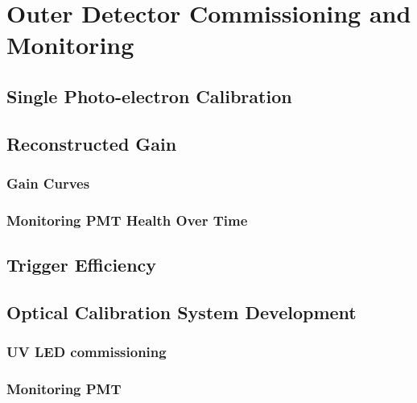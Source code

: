 \chapter{Outer Detector Commissioning and Monitoring}
\section{Single Photo-electron Calibration}

\section{Reconstructed Gain}
\subsection{Gain Curves}
\subsection{Monitoring PMT Health Over Time}

\section{Trigger Efficiency}

\section{Optical Calibration System Development}
\subsection{UV LED commissioning}

\subsection{Monitoring PMT}